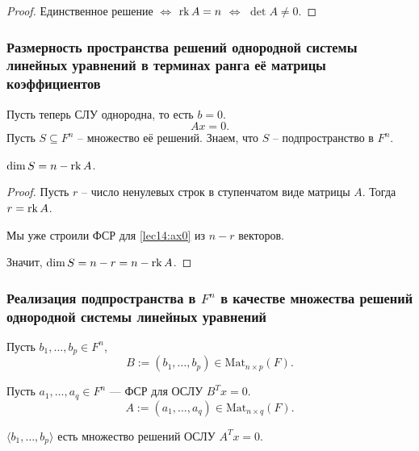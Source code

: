\begin{proof}
    Единственное решение $\iff$ $\operatorname{\mathop{\mathrm{rk}}} A = n$ $\iff$ $\det A \neq 0$.
\end{proof}

\begin{comment}
    Это единственное решение равно $x = A^{-1}b$.
\end{comment}


\subsubsection{Размерность пространства решений однородной системы линейных уравнений в терминах ранга её матрицы коэффициентов}

Пусть теперь СЛУ однородна, то есть $b = 0$.
\begin{equation*}
    \tag{$\star$}
    \label{lec14:ax0}
    Ax = 0
.\end{equation*}
Пусть $S \subseteq F^n$ -- множество её решений. Знаем, что $S$ -- подпространство в $F^n$.

\begin{proposal}
    $\dim S = n - \operatorname{\mathop{\mathrm{rk}}} A$.
\end{proposal}

\begin{proof}
    Пусть $r$ -- число ненулевых строк в ступенчатом виде матрицы $A$.
    Тогда $r = \operatorname{\mathop{\mathrm{rk}}} A$.

    Мы уже строили ФСР для \eqref{lec14:ax0} из $n - r$ векторов.

    Значит, $\dim S = n - r = n - \operatorname{\mathop{\mathrm{rk}}} A$.
\end{proof}


\subsubsection{Реализация подпространства в $F^n$ в качестве множества решений однородной системы линейных уравнений}

\bigskip
Пусть $b_1, \dots, b_p \in F^{n}$,
\begin{equation*}
    B := (b_1, \dots, b_p) \in \text{Mat}_{n \times p}(F)
.\end{equation*}

Пусть $a_1, \dots, a_q \in F^{n}$ --- ФСР для ОСЛУ $B^{T}x = 0$.
\begin{equation*}
    A := (a_1, \dots, a_q) \in \text{Mat}_{n \times q}(F)
.\end{equation*}

\begin{proposal}
    $\langle b_1, \dots, b_p \rangle$ есть множество решений ОСЛУ $A^T x = 0$.
\end{proposal}

